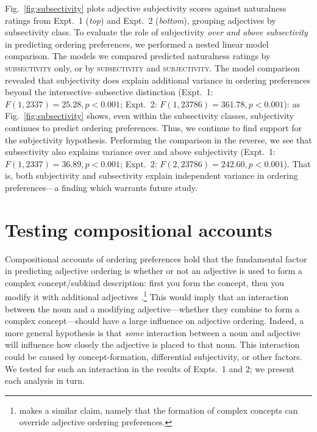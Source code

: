 \documentclass[12pt]{article}
\newcommand{\jd}[1]{\textcolor{red}{[jd: #1]}}
\begin{document}
Fig.~\ref{fig:subsectivity} plots adjective subjectivity scores against naturalness ratings from Expt.~1 (\emph{top}) and Expt.~2 (\emph{bottom}), grouping adjectives by subsectivity class. To evaluate the role of subjectivity \emph{over and above subsectivity} in predicting ordering preferences, we performed a nested linear model comparison. The models  %
we compared predicted naturalness ratings by \textsc{subsectivity} only, or by \textsc{subsectivity} and \textsc{subjectivity}. The model comparison revealed that subjectivity does explain additional variance in ordering preferences beyond the intersective--subsective distinction (Expt.~1: $F(1,2337)=25.28, p<0.001$; Expt.~2: $F(1,23786)=361.78, p<0.001$): as Fig.~\ref{fig:subsectivity} shows, even within the subsectivity classes, subjectivity continues to predict ordering preferences. Thus, we continue to find support for the subjectivity hypothesis.  Performing the comparison in the reverse, we see that subsectivity also explains variance over and above subjectivity (Expt.~1: $F(1,2337)=36.89, p<0.001$; Expt.~2: $F(2,23786)=242.60, p<0.001$). That is, both subjectivity and subsectivity explain independent variance in ordering preferences---a finding which warrants future study.


\section{Testing compositional accounts}

Compositional accounts of ordering preferences hold that the fundamental factor in predicting adjective ordering is whether or not an adjective is used to form a complex concept/subkind description: first you form the concept, then you modify it with additional adjectives \citep{McNally2004,svenonius2008}.\footnote{\cite{bouchard2005} makes a similar claim, namely that the formation of complex concepts can override adjective ordering preferences.} 
This would imply that an interaction between the noun and a modifying adjective---whether they combine to form a complex concept---should have a large influence on adjective ordering. 
Indeed, a more general hypothesis is that \emph{some} interaction between a noun and adjective will influence how closely the adjective is placed to that noun. This interaction could be caused by concept-formation, differential subjectivity, or other factors. We tested for such an interaction in the results of Expts.~1 and 2; we present each analysis in turn.
\end{document}
